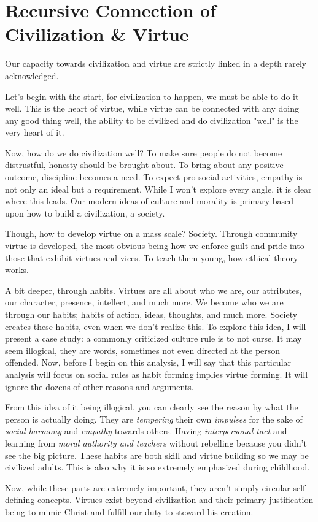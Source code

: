 \section{Recursive Connection of Civilization \& Virtue}
\par Our capacity towards civilization and virtue are strictly linked in a depth rarely acknowledged.
\par Let's begin with the start, for civilization to happen, we must be able to do it well. This is the heart of virtue, while virtue can be connected with any doing any good thing well, the ability to be civilized and do civilization "well" is the very heart of it.
\par Now, how do we do civilization well? To make sure people do not become distrustful, honesty should be brought about. To bring about any positive outcome, discipline becomes a need. To expect pro-social activities, empathy is not only an ideal but a requirement. While I won't explore every angle, it is clear where this leads. Our modern ideas of culture and morality is primary based upon how to build a civilization, a society.
\par Though, how to develop virtue on a mass scale? Society. Through community virtue is developed, the most obvious being how we enforce guilt and pride into those that exhibit virtues and vices. To teach them young, how ethical theory works.
\par A bit deeper, through habits. Virtues are all about who we are, our attributes, our character, presence, intellect, and much more. We become who we are through our habits; habits of action, ideas, thoughts, and much more. Society creates these habits, even when we don't realize this. To explore this idea, I will present a case study: a commonly criticized culture rule is to not curse. It may seem illogical, they are words, sometimes not even directed at the person offended. Now, before I begin on this analysis, I will say that this particular analysis will focus on social rules as habit forming implies virtue forming. It will ignore the dozens of other reasons and arguments.
\par From this idea of it being illogical, you can clearly see the reason by what the person is actually doing. They are \textit{tempering} their own \textit{impulses} for the sake of \textit{social harmony} and \textit{empathy} towards others. Having \textit{interpersonal tact} and learning from \textit{moral authority and teachers} without rebelling because you didn't see the big picture. These habits are both skill and virtue building so we may be civilized adults. This is also why it is so extremely emphasized during childhood.
\\
\par Now, while these parts are extremely important, they aren't simply circular self-defining concepts. Virtues exist beyond civilization and their primary justification being to mimic Christ and fulfill our duty to steward his creation.
